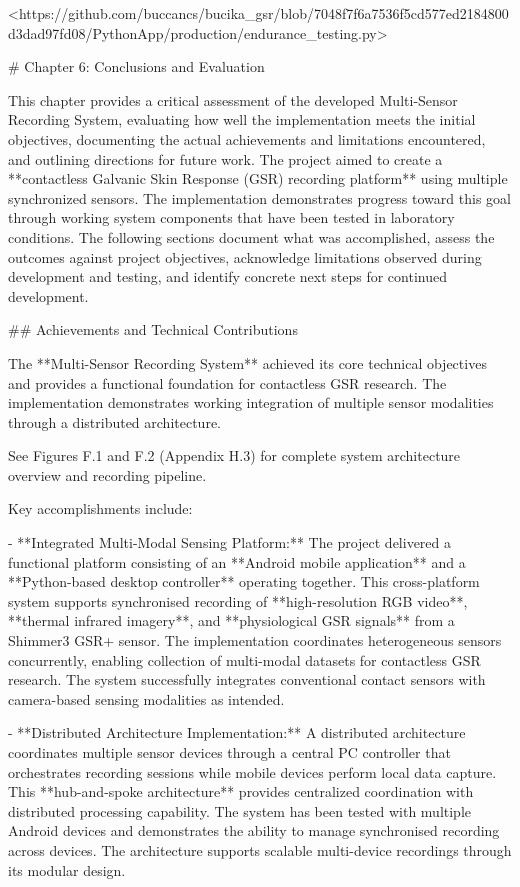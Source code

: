 \documentclass[12pt,a4paper]{article}
\begin{document}
{<https://github.com/buccancs/bucika_gsr/blob/7048f7f6a7536f5cd577ed2184800d3dad97fd08/PythonApp/production/endurance_testing.py>


\newpage


# Chapter 6: Conclusions and Evaluation

This chapter provides a critical assessment of the developed Multi-Sensor Recording System, evaluating how well the implementation meets the initial objectives, documenting the actual achievements and limitations encountered, and outlining directions for future work. The project aimed to create a **contactless Galvanic Skin Response (GSR) recording platform** using multiple synchronized sensors. The implementation demonstrates progress toward this goal through working system components that have been tested in laboratory conditions. The following sections document what was accomplished, assess the outcomes against project objectives, acknowledge limitations observed during development and testing, and identify concrete next steps for continued development.

## Achievements and Technical Contributions

The **Multi-Sensor Recording System** achieved its core technical objectives and provides a functional foundation for contactless GSR research. The implementation demonstrates working integration of multiple sensor modalities through a distributed architecture. 

See Figures F.1 and F.2 (Appendix H.3) for complete system architecture overview and recording pipeline.

Key accomplishments include:

- **Integrated Multi-Modal Sensing Platform:** The project delivered a
  functional platform consisting of an **Android mobile application**
  and a **Python-based desktop controller** operating together. This
  cross-platform system supports synchronised recording of
  **high-resolution RGB video**, **thermal infrared imagery**, and
  **physiological GSR signals** from a Shimmer3 GSR+ sensor. The
  implementation coordinates heterogeneous sensors concurrently, enabling
  collection of multi-modal datasets for contactless GSR research. The
  system successfully integrates conventional contact sensors with
  camera-based sensing modalities as intended.

- **Distributed Architecture Implementation:** A distributed architecture
  coordinates multiple sensor devices through a central PC controller
  that orchestrates recording sessions while mobile devices perform local
  data capture. This **hub-and-spoke architecture** provides centralized
  coordination with distributed processing capability. The system has been
  tested with multiple Android devices and demonstrates the ability to
  manage synchronised recording across devices. The architecture supports
  scalable multi-device recordings through its modular design.

}
\end{document}
